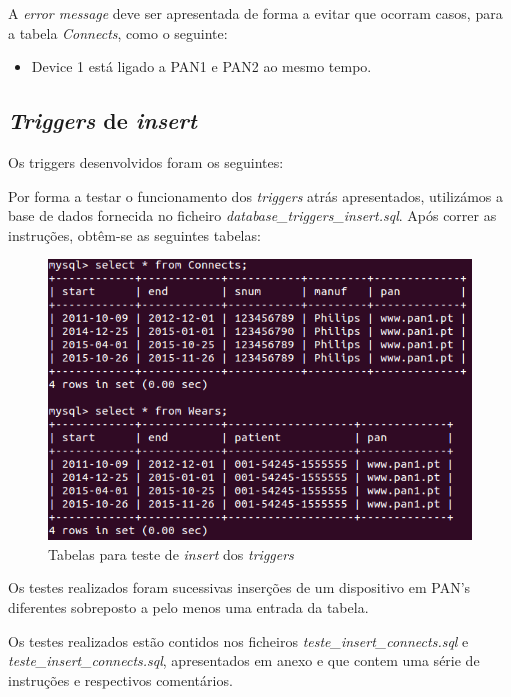 \documentclass[a4paper]{article}
\begin{document}
A \textit{error message} deve ser apresentada de forma a evitar que ocorram casos,  para a tabela \textit{Connects}, como o seguinte: 

\begin{itemize}

\item Device 1 está ligado a PAN1 e PAN2 ao mesmo tempo.

\end{itemize}
\pagebreak
\subsection{\textit{Triggers} de \textit{insert}}

Os triggers desenvolvidos foram os seguintes:



Por forma a testar o funcionamento dos \textit{triggers} atrás apresentados, utilizámos a base de dados fornecida no ficheiro \textit{database\_triggers\_insert.sql}. Após correr as instruções, obtêm-se as seguintes tabelas:
\begin{figure}[ht!]
\centering
\includegraphics[scale=0.7]{tabelas_insert_triggers.png}
\caption{Tabelas para teste de \textit{insert} dos \textit{triggers}}
\end{figure}

Os testes realizados foram sucessivas inserções de um dispositivo em PAN's diferentes sobreposto a pelo menos uma entrada da tabela.

Os testes realizados estão contidos nos ficheiros \textit{teste\_insert\_connects.sql} e \textit{teste\_insert\_connects.sql}, apresentados em anexo e que contem uma série de instruções e respectivos comentários.
%
%
%
\end{document}
